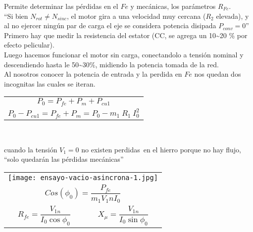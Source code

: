 \documentclass[11pt,a4paper]{article}
\begin{document}
\newpage
\begin{multicols}{2}
\begin{cajita}
	
	
		\begin{flushleft}
			
			Permite determinar las pérdidas en el $Fe$ y mecánicas,
			los parámetros $R_{Fe}$.\\
			``Si bien $N_{rot}\neq N_{sinc}$, el motor gira a una velocidad muy cercana ($R_2$ elevada), y al no ejercer ningún par de carga el eje se considera potencia disipada $P_{conv}=0$''\\
			Primero hay que medir la resistencia del estator (CC, se agrega un 10\textasciitilde20 \% por efecto pelicular).\\
			Luego hacemos funcionar el motor sin carga, conectandolo a tensión nominal y descendiendo hasta le 50\textasciitilde30\%, midiendo la potencia tomada de la red.\\
			Al nosotros conocer la potencia de entrada y la perdida en $Fe$ nos quedan dos incognitas las cuales se iteran.\\

		\end{flushleft}
	
			\begin{tabular}{c c}
				\multicolumn{2}{c}{$P_0=P_{fe}+P_m+P_{cu1}$}\\
				\multicolumn{2}{c}{$P_0-P_{cu1}=P_{fe}+P_m=P_0-m_1~R_1~I_{0}^{2}$}\\
			\end{tabular}\\
			\begin{flushleft}
				cuando la tensión $V_1=0$ no existen perdidas\ en el hierro porque no hay flujo, ``solo quedarán las pérdidas mecánicas''\\	
			\end{flushleft}	
			\begin{tabular}{c c}
				\multicolumn{2}{c}{\texttt{[image: ensayo-vacio-asincrona-1.jpg]}}\\
				\multicolumn{2}{c}{$Cos(\phi_0)=\dfrac{P_{fe}}{m_1 V_1n I_0}$} \\ [0.3 cm ]
				$ R_{fe}=\dfrac{V_{1n}}{I_{0} \cos \phi_0} $ &$X_{\mu}=\dfrac{V_{1n}}{I_{0}\sin \phi_0}$\\
			\end{tabular}\\

		\end{cajita}
		


\end{multicols}
\end{document}
